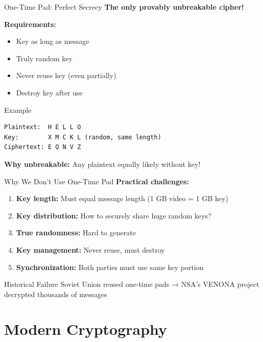 \documentclass{beamer}
\begin{document}
\begin{frame}[fragile]{One-Time Pad: Perfect Secrecy}
\textbf{The only provably unbreakable cipher!}

\vspace{0.3cm}
\textbf{Requirements:}
\begin{itemize}
    \item Key as long as message
    \item Truly random key
    \item Never reuse key (even partially)
    \item Destroy key after use
\end{itemize}
\pause
\vspace{0.3cm}
\begin{exampleblock}{Example}
\begin{verbatim}
Plaintext:  H E L L O
Key:        X M C K L (random, same length)
Ciphertext: E Q N V Z
\end{verbatim}
\end{exampleblock}

\textbf{Why unbreakable:} Any plaintext equally likely without key!
\end{frame}

\begin{frame}{Why We Don't Use One-Time Pad}
\textbf{Practical challenges:}

\begin{enumerate}
    \item \textbf{Key length:} Must equal message length (1 GB video = 1 GB key)
    \item \textbf{Key distribution:} How to securely share huge random keys?
    \item \textbf{True randomness:} Hard to generate
    \item \textbf{Key management:} Never reuse, must destroy
    \item \textbf{Synchronization:} Both parties must use same key portion
\end{enumerate}
\pause
\vspace{0.3cm}
\begin{alertblock}{Historical Failure}
Soviet Union reused one-time pads → NSA's VENONA project decrypted thousands of messages
\end{alertblock}
\end{frame}

\section{Modern Cryptography}
\end{document}

